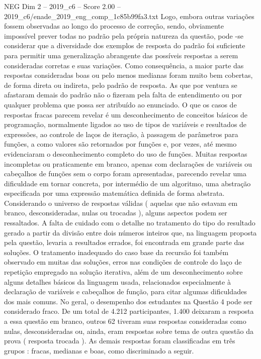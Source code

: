 \begin{textsample}{NEG Dim 2 – 2019\_c6 – Score 2.00 – 2019\_c6/enade\_2019\_eng\_comp\_1c85b99fa3.txt}
Logo, embora outras variações fossem observadas ao longo do processo de correção, sendo, obviamente impossível prever todas no padrão pela própria natureza da questão, pode -se considerar que a diversidade dos exemplos de resposta do padrão foi suficiente para permitir uma generalização abrangente das possíveis respostas a serem consideradas corretas e suas variações.
Como consequência, a maior parte das respostas consideradas boas ou pelo menos medianas foram muito bem cobertas, de forma direta ou indireta, pelo padrão de resposta.
As que por ventura se afastaram demais do padrão não o fizeram pela falta de entendimento ou por qualquer problema que possa ser atribuído ao enunciado.
O que os casos de respostas fracas parecem revelar é um desconhecimento de conceitos básicos de programação, normalmente ligados ao uso de tipos de variáveis e resultados de expressões, ao controle de laços de iteração, à passagem de parâmetros para funções, a como valores são retornados por funções e, por vezes, até mesmo evidenciaram o desconhecimento completo do uso de funções.
Muitas respostas incompletas ou praticamente em branco, apenas com declarações de variáveis ou cabeçalhos de funções sem o corpo foram apresentadas, parecendo revelar uma dificuldade em tornar concreta, por intermédio de um algoritmo, uma abstração especificada por uma expressão matemática definida de forma abstrata.
Considerando o universo de respostas válidas ( aquelas que não estavam em branco, desconsideradas, nulas ou trocadas ), alguns aspectos podem ser ressaltados.
A falta de cuidado com o detalhe no tratamento do tipo do resultado gerado a partir da divisão entre dois números inteiros que, na linguagem proposta pela questão, levaria a resultados errados, foi encontrada em grande parte das soluções.
O tratamento inadequado do caso base da recursão foi também observado em muitas das soluções, erros nas condições de controle do laço de repetição empregado na solução iterativa, além de um desconhecimento sobre alguns detalhes básicos da linguagem usada, relacionados especialmente à declaração de variáveis e cabeçalhos de função, para citar algumas dificuldades dos mais comuns.
No geral, o desempenho dos estudantes na Questão 4 pode ser considerado fraco.
De um total de 4.212 participantes, 1.400 deixaram a resposta a essa questão em branco, outros 62 tiveram suas respostas consideradas como nulas, desconsideradas ou, ainda, eram respostas sobre tema de outra questão da prova ( resposta trocada ).
As demais respostas foram classificadas em três grupos : fracas, medianas e boas, como discriminado a seguir.

\end{textsample}

